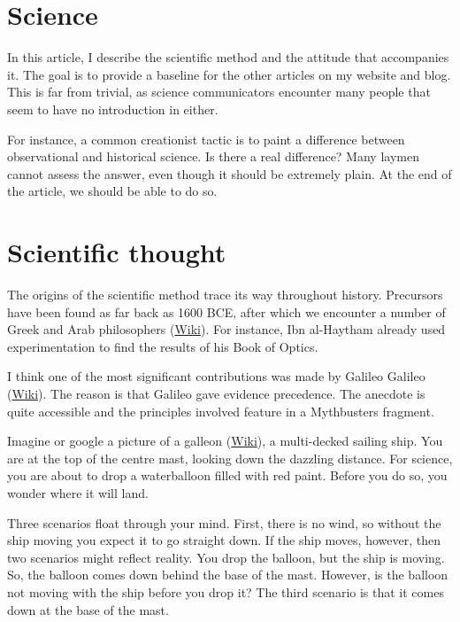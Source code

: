 \begin{multicols}{2}
\section{Science}

In this article, I describe the scientific method and the attitude that accompanies it. The goal is to provide a baseline
for the other articles on my website and blog. This is far from trivial, as science communicators encounter many people
that seem to have no introduction in either.


For instance, a common creationist tactic is to paint a difference between observational and historical science. Is there
a real difference? Many laymen cannot assess the answer, even though it should be extremely plain. At the end of the article, we
should be able to do so.

\section{Scientific thought}

The origins of the scientific method trace its way throughout history. Precursors have been found as far back as 1600 BCE,
after which we encounter a number of Greek and Arab philosophers (\href{http://en.wikipedia.org/wiki/List_of_ancient_Greek_philosophers}{Wiki}). For instance, Ibn al-Haytham already used experimentation
to find the results of his Book of Optics. 


I think one of the most significant contributions was made by Galileo Galileo (\href{https://en.wikipedia.org/wiki/Galileo_Galilei}{Wiki}). The reason is that Galileo gave evidence precedence. The anecdote is quite accessible and the principles involved
feature in a Mythbusters fragment.  


Imagine or google a picture of a galleon (\href{https://en.wikipedia.org/wiki/Galleon}{Wiki}), a multi-decked sailing ship.
You are at the top of the centre mast, looking down the dazzling distance. For science, you are about to drop a waterballoon filled with red paint.
Before you do so, you wonder where it will land.


Three scenarios float through your mind. First, there is no wind, so without the ship moving you expect it to go straight down. If the ship moves,
however, then two scenarios might reflect reality. You drop the balloon, but the ship is moving. So, the balloon comes down behind the base of
the mast. However, is the balloon not moving with the ship before you drop it? The third scenario is that it comes down at the base of the mast.



\end{multicols}
